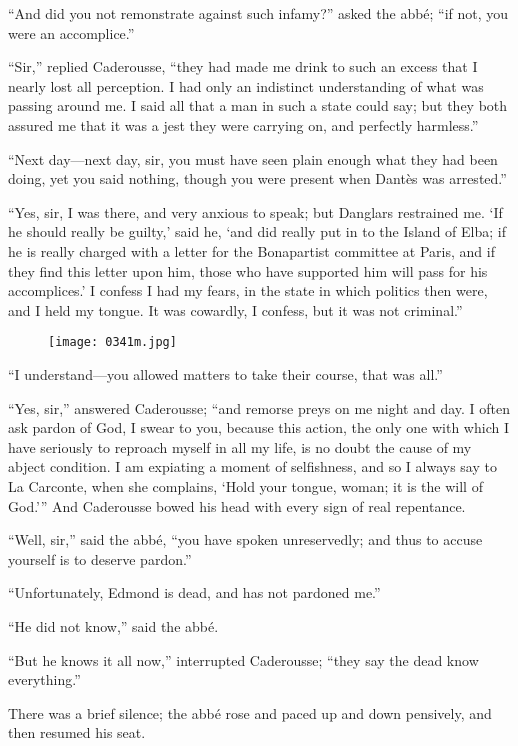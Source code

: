 “And did you not remonstrate against such infamy?” asked the abbé; “if
not, you were an accomplice.”

“Sir,” replied Caderousse, “they had made me drink to such an excess
that I nearly lost all perception. I had only an indistinct
understanding of what was passing around me. I said all that a man in
such a state could say; but they both assured me that it was a jest
they were carrying on, and perfectly harmless.”

“Next day—next day, sir, you must have seen plain enough what they had
been doing, yet you said nothing, though you were present when Dantès
was arrested.”

“Yes, sir, I was there, and very anxious to speak; but Danglars
restrained me. ‘If he should really be guilty,’ said he, ‘and did
really put in to the Island of Elba; if he is really charged with a
letter for the Bonapartist committee at Paris, and if they find this
letter upon him, those who have supported him will pass for his
accomplices.’ I confess I had my fears, in the state in which politics
then were, and I held my tongue. It was cowardly, I confess, but it was
not criminal.”

\begin{figure}[ht]
\texttt{[image: 0341m.jpg]}
\end{figure}

“I understand—you allowed matters to take their course, that was all.”

“Yes, sir,” answered Caderousse; “and remorse preys on me night and
day. I often ask pardon of God, I swear to you, because this action,
the only one with which I have seriously to reproach myself in all my
life, is no doubt the cause of my abject condition. I am expiating a
moment of selfishness, and so I always say to La Carconte, when she
complains, ‘Hold your tongue, woman; it is the will of God.’” And
Caderousse bowed his head with every sign of real repentance.

“Well, sir,” said the abbé, “you have spoken unreservedly; and thus to
accuse yourself is to deserve pardon.”

“Unfortunately, Edmond is dead, and has not pardoned me.”

“He did not know,” said the abbé.

“But he knows it all now,” interrupted Caderousse; “they say the dead
know everything.”

There was a brief silence; the abbé rose and paced up and down
pensively, and then resumed his seat.

